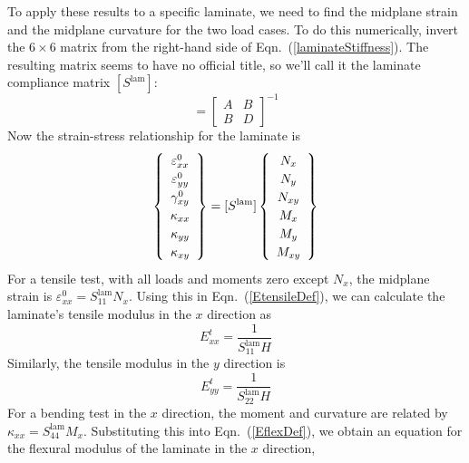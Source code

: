 \documentclass[11pt]{article}
\begin{document}
To apply these results to a specific laminate, we need to find the midplane strain and the midplane curvature for the two load cases.  To do this numerically, invert the $6 \times 6$ matrix from the right-hand side of Eqn.~(\ref{laminateStiffness}).  The resulting matrix seems to have no official title, so we'll call it the laminate compliance matrix $[S^\mathrm{lam}]$:
\begin{equation}
    [S^\mathrm{lam}] 
    = 
   \left[ \begin{array}{c|c}
            A & B \\
            \hline
            B & D
      \end{array} \right] ^{-1}
   \label{SlamDef}
\end{equation}
Now the strain-stress relationship for the laminate is
\begin{equation}
\renewcommand\arraystretch{1.2}
        \left\{ \begin{array}{c}
           \varepsilon^0_{xx}  \\  \varepsilon^0_{yy}  \\  \gamma^0_{xy}  \\ \kappa_{xx}  \\  \kappa_{yy}  \\  \kappa_{xy}
           \end{array} \right\}
           = [S^\mathrm{lam}] 
\renewcommand\arraystretch{1.2}
   \left\{ \begin{array}{c}
     N_x \\ N_y \\ N_{xy} \\  M_x \\ M_y \\ M_{xy}
   \end{array} \right\}
     \label{laminateCompliance}     
\end{equation}
For a tensile test, with all loads and moments zero except $N_x$, the midplane strain is $\varepsilon^0_{xx} = S^\mathrm{lam}_{11} N_x$.  Using this in Eqn.~(\ref{EtensileDef}), we can calculate the laminate's tensile modulus in the $x$ direction as
\begin{equation}
     E^t_{xx} = \frac{1}{S^\mathrm{lam}_{11} H} 
     \label{EtxxFinal}
 \end{equation}
 Similarly, the tensile modulus in the $y$ direction is
\begin{equation}
     E^t_{yy} = \frac{1}{S^\mathrm{lam}_{22} H} 
     \label{EtyyFinal}
 \end{equation}
 For a bending test in the $x$ direction, the moment and curvature are related by $\kappa_{xx} = S^\mathrm{lam}_{44} M_x$.  Substituting this into Eqn.~(\ref{EflexDef}), we obtain an equation for the flexural modulus of the laminate in the $x$ direction,
\end{document}

